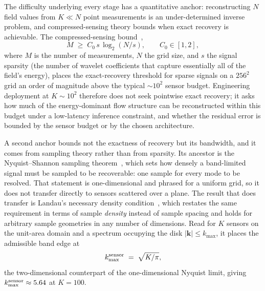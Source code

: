 The difficulty underlying every stage has a quantitative anchor: reconstructing $N$ field values from $K \ll N$ point measurements is an under-determined inverse problem, and compressed-sensing theory bounds when exact recovery is achievable. The compressed-sensing bound~\cite{Donoho2006, Candes2006},
\begin{equation}
    \label{eq:cs_bound}
    M \;\ge\; C_0 \, s \, \log_2(N/s),\qquad C_0\in[1,2],
\end{equation}
where $M$ is the number of measurements, $N$ the grid size, and $s$ the signal sparsity (the number of wavelet coefficients that capture essentially all of the field's energy), places the exact-recovery threshold for sparse signals on a $256^2$ grid an order of magnitude above the typical $\sim 10^2$ sensor budget. Engineering deployment at $K \sim 10^2$ therefore does not seek pointwise exact recovery; it asks how much of the energy-dominant flow structure can be reconstructed within this budget under a low-latency inference constraint, and whether the residual error is bounded by the sensor budget or by the chosen architecture.\label{sec:underdetermined}

A second anchor bounds not the exactness of recovery but its bandwidth, and it comes from sampling theory rather than from sparsity. Its ancestor is the Nyquist--Shannon sampling theorem~\cite{Shannon1949}, which sets how densely a band-limited signal must be sampled to be recoverable: one sample for every mode to be resolved. That statement is one-dimensional and phrased for a uniform grid, so it does not transfer directly to sensors scattered over a plane. The result that does transfer is Landau's necessary density condition~\cite{Landau1967}, which restates the same requirement in terms of sample \emph{density} instead of sample spacing and holds for arbitrary sample geometries in any number of dimensions. Read for $K$ sensors on the unit-area domain and a spectrum occupying the disk $|\mathbf{k}| \le k_{\max}$, it places the admissible band edge at
\begin{equation}
    \label{eq:sensor_nyquist}
    k_{\max}^{\rm sensor} \;=\; \sqrt{K/\pi},
\end{equation}
the two-dimensional counterpart of the one-dimensional Nyquist limit, giving $k_{\max}^{\rm sensor} \approx 5.64$ at $K=100$.

